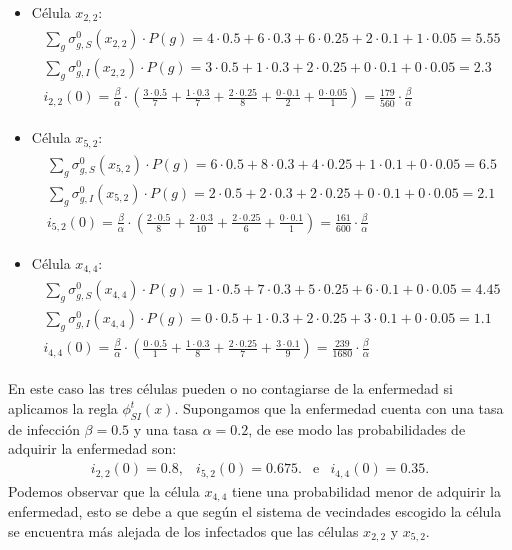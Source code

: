 \begin{itemize}
    \item Célula $x_{2,2}$:
    \begin{align*}
    \begin{array}{l}
        \sum_g\sigma_{g,S}^0(x_{2,2})\cdot P(g) = 4\cdot0.5+6\cdot0.3+6\cdot0.25+2\cdot0.1+1\cdot0.05 = 5.55 \\
        \sum_g\sigma_{g,I}^0(x_{2,2})\cdot P(g) = 3\cdot0.5+1\cdot0.3+2\cdot0.25+0\cdot0.1+0\cdot0.05 = 2.3\\
        i_{2,2}(0) = \frac{\beta}{\alpha}\cdot\left(\frac{3\cdot0.5}{7}+\frac{1\cdot0.3}{7}+\frac{2\cdot0.25}{8}+\frac{0\cdot0.1}{2}+\frac{0\cdot0.05}{1}\right)=\frac{179}{560}\cdot\frac{\beta}{\alpha}
    \end{array}
    \end{align*}
    \item Célula $x_{5,2}$:
    \begin{align*}
    \begin{array}{l}
        \sum_g\sigma_{g,S}^0(x_{5,2})\cdot P(g) = 6\cdot0.5+8\cdot0.3+4\cdot0.25+1\cdot0.1+0\cdot0.05 = 6.5 \\
        \sum_g\sigma_{g,I}^0(x_{5,2})\cdot P(g) = 2\cdot0.5+2\cdot0.3+2\cdot0.25+0\cdot0.1+0\cdot0.05 = 2.1\\
        i_{5,2}(0) = \frac{\beta}{\alpha}\cdot\left(\frac{2\cdot0.5}{8}+\frac{2\cdot0.3}{10}+\frac{2\cdot0.25}{6}+\frac{0\cdot0.1}{1}\right)=\frac{161}{600}\cdot\frac{\beta}{\alpha}
    \end{array}
    \end{align*}
    \item Célula $x_{4,4}$:
    \begin{align*}
    \begin{array}{l}
        \sum_g\sigma_{g,S}^0(x_{4,4})\cdot P(g) = 1\cdot0.5+7\cdot0.3+5\cdot0.25+6\cdot0.1+0\cdot0.05 = 4.45 \\
        \sum_g\sigma_{g,I}^0(x_{4,4})\cdot P(g) = 0\cdot0.5+1\cdot0.3+2\cdot0.25+3\cdot0.1+0\cdot0.05 = 1.1\\
        i_{4,4}(0) = \frac{\beta}{\alpha}\cdot\left(\frac{0\cdot0.5}{1}+\frac{1\cdot0.3}{8}+\frac{2\cdot0.25}{7}+\frac{3\cdot0.1}{9}\right)=\frac{239}{1680}\cdot\frac{\beta}{\alpha}
    \end{array}
    \end{align*}
\end{itemize}
En este caso las tres células pueden o no contagiarse de la enfermedad si aplicamos la regla $\phi_{SI}^t(x)$. Supongamos que la enfermedad cuenta con una tasa de infección $\beta=0.5$ y una tasa $\alpha=0.2$, de ese modo las probabilidades de adquirir la enfermedad son:
$$\begin{array}{ccccc}
    i_{2,2}(0)=0.8, & i_{5,2}(0)=0.675. & \text{e} & i_{4,4}(0)=0.35.
\end{array}$$
Podemos observar que la célula $x_{4,4}$ tiene una probabilidad menor de adquirir la enfermedad, esto se debe a que según el sistema de vecindades escogido la célula se encuentra más alejada de los infectados que las células $x_{2,2}$ y $x_{5,2}$.\\

